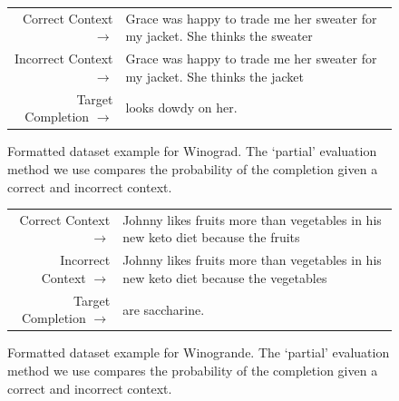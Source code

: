 \begin{figure} { \tt \footnotesize \begin{tabularx}{\linewidth}{r X} \toprule
Correct Context $\to$ & Grace was happy to trade me her sweater for my jacket. She thinks the sweater\\
Incorrect Context $\to$ & Grace was happy to trade me her sweater for my jacket. She thinks the jacket\\
 \midrule
Target Completion $\to$ & looks dowdy on her. \\
 \bottomrule \end{tabularx} }
\caption{Formatted dataset example for Winograd.  The `partial' evaluation method we use compares the probability of the completion given a correct and incorrect context.}  \label{eval:Winograd}  \end{figure}%
\begin{figure} { \tt \footnotesize \begin{tabularx}{\linewidth}{r X}
\toprule
Correct Context $\to$ & Johnny likes fruits more than vegetables in his new keto diet because the fruits \\
Incorrect Context $\to$ & Johnny likes fruits more than vegetables in his new keto diet because the vegetables \\
\midrule
Target Completion $\to$ & are saccharine. \\
\bottomrule \end{tabularx} }  \caption{Formatted dataset example for Winogrande. The `partial' evaluation method we use compares the probability of the completion given a correct and incorrect context.}  \label{eval:Winogrande}  \end{figure}%
